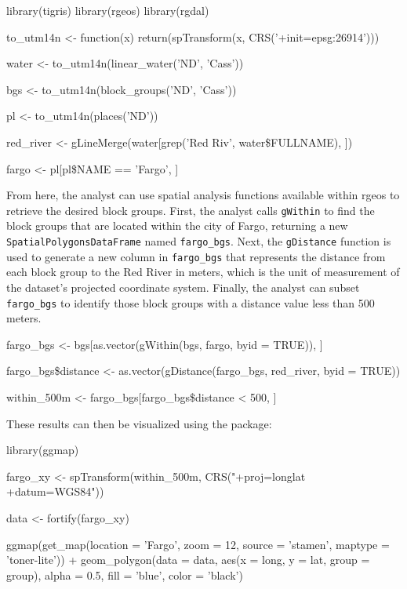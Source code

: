 \begin{Schunk}
\begin{Sinput}
library(tigris)
library(rgeos)
library(rgdal)

to_utm14n <- function(x) {
  return(spTransform(x, CRS('+init=epsg:26914')))
} 
 
water <- to_utm14n(linear_water('ND', 'Cass'))

bgs <- to_utm14n(block_groups('ND', 'Cass'))

pl <- to_utm14n(places('ND'))

red_river <- gLineMerge(water[grep('Red Riv', water\$FULLNAME), ]) 

fargo <- pl[pl\$NAME == 'Fargo', ]
\end{Sinput}
\end{Schunk}

From here, the analyst can use spatial analysis functions available
within rgeos to retrieve the desired block groups. First, the analyst
calls \texttt{gWithin} to find the block groups that are located within
the city of Fargo, returning a new \texttt{SpatialPolygonsDataFrame}
named \texttt{fargo\_bgs}. Next, the \texttt{gDistance} function is used
to generate a new column in \texttt{fargo\_bgs} that represents the
distance from each block group to the Red River in meters, which is the
unit of measurement of the dataset's projected coordinate system.
Finally, the analyst can subset \texttt{fargo\_bgs} to identify those
block groups with a distance value less than 500 meters.

\begin{Schunk}
\begin{Sinput}
fargo_bgs <- bgs[as.vector(gWithin(bgs, fargo, byid = TRUE)), ]

fargo_bgs\$distance <- as.vector(gDistance(fargo_bgs, red_river, byid = TRUE))

within_500m <- fargo_bgs[fargo_bgs\$distance < 500, ]
\end{Sinput}
\end{Schunk}

These results can then be visualized using the  package:

\begin{Schunk}
\begin{Sinput}
library(ggmap)

fargo_xy <- spTransform(within_500m, CRS("+proj=longlat +datum=WGS84"))

data <- fortify(fargo_xy)

ggmap(get_map(location = 'Fargo', zoom = 12, source = 'stamen', maptype = 'toner-lite')) + 
  geom_polygon(data = data, aes(x = long, y = lat, group = group), 
               alpha = 0.5, fill = 'blue', color = 'black')
\end{Sinput}
\end{Schunk}

